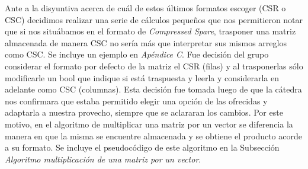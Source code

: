\documentclass[a4paper]{article}
\begin{document}
 Ante a la disyuntiva acerca de cu\'al de estos \'ultimos formatos escoger (CSR o CSC) decidimos realizar una serie de c\'alculos peque\~nos que nos permitieron notar que si nos situ\'abamos en el formato de \textit{Compressed Spare}, trasponer una matriz almacenada de manera CSC no ser\'ia m\'as que interpretar sus mismos arreglos como CSC. Se incluye un ejemplo en \emph{Ap\'endice C}. Fue decisi\'on del grupo considerar el formato por defecto de la matriz el CSR (filas) y al trasponerlas s\'olo modificarle un bool que indique si est\'a traspuesta y leerla y considerarla en adelante como CSC (columnas). Esta decisi\'on fue tomada luego de que la c\'atedra nos confirmara que estaba permitido elegir una opci\'on de las ofrecidas y adaptarla a nuestra provecho, siempre que se aclararan los cambios. Por este motivo, en el algoritmo de multiplicar una matriz por un vector se diferencia la manera en que la misma se encuentre almacenada y se obtiene el producto acorde a su formato. Se incluye el pseudoc\'odigo de este algoritmo en la Subsecci\'on \emph{Algoritmo multiplicaci\'on de una matriz por un vector}. \\

\newpage
\end{document}
